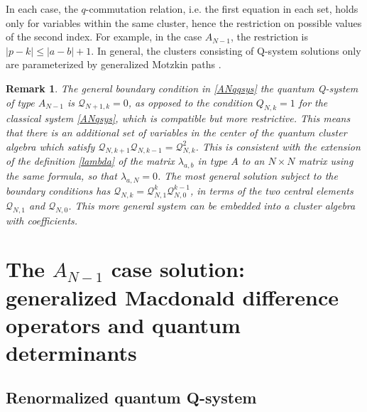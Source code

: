 \documentclass[12pt]{amsart}
\newtheorem{remark}[thm]{Remark}
\newcommand{\Q}{{\mathcal Q}}
\numberwithin{equation}{section}
\numberwithin{table}{section}
\begin{document}
In each case, the $q$-commutation relation, i.e. the first equation in each set, holds only for variables within the same cluster, hence the restriction on possible values of the second index. For example, in the case $A_{N-1}$, the restriction is $|p-k|\leq |a-b|+1$. In general, the clusters consisting of Q-system solutions only are parameterized by generalized Motzkin paths \cite{Simon}.

\begin{remark}\label{boundary_condition}
The  general boundary condition in \eqref{ANqqsys} the quantum Q-system of type $A_{N-1}$ is $\Q_{N+1,k}=0$, as opposed to the condition $Q_{N,k}=1$ for the classical system \eqref{ANqsys}, which is compatible but more restrictive.
This means that there is an additional set of  variables in the center of the quantum cluster algebra which satisfy
$\Q_{N,k+1}\Q_{N,k-1}=\Q_{N,k}^2$. This is consistent with the extension of the definition \eqref{lambda} of the matrix $\lambda_{a,b}$ in type $A$ to an $N\times N$ matrix using the same formula, so that $\lambda_{a,N}=0$.
The most general solution subject to the boundary conditions has $\Q_{N,k}=\Q_{N,1}^k \Q_{N,0}^{k-1}$, in terms of the two central elements $\Q_{N,1}$ and $\Q_{N,0}$. This more general system can be embedded into a cluster algebra with coefficients.
\end{remark}

\section{The $A_{N-1}$ case solution: generalized Macdonald difference 
operators and quantum determinants}\label{sec:A}

\subsection{Renormalized quantum Q-system}
\end{document}
